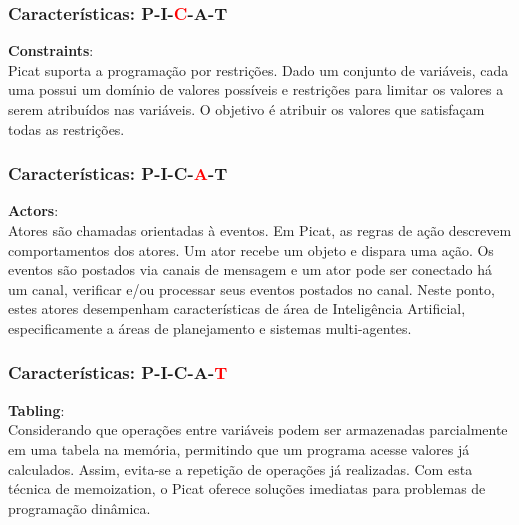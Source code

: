 \documentclass{beamer}
\begin{document}
\begin{frame}
    \frametitle{Características: P-I-\textcolor{red}{C}-A-T}
    \textbf{Constraints}:\\ 
    Picat suporta a programação por restrições. 
    Dado um conjunto de variáveis, 
    cada uma possui um domínio de valores possíveis e restrições para limitar os valores a serem atribuídos nas variáveis. 
    O objetivo é atribuir os valores que satisfaçam todas as restrições. 
\end{frame}


\begin{frame}
    \frametitle{Características: P-I-C-\textcolor{red}{A}-T}
    \textbf{Actors}:\\ 
    Atores são chamadas orientadas à eventos.
		Em Picat, as regras de ação descrevem comportamentos dos atores.
		Um ator recebe um objeto e dispara uma ação. 
		Os eventos são postados via canais de mensagem e um ator pode ser conectado há um canal, verificar e/ou processar seus eventos postados no canal.
		Neste ponto, estes atores desempenham características de área de Inteligência Artificial, especificamente a áreas de planejamento e sistemas multi-agentes.   
\end{frame}


\begin{frame}
    \frametitle{Características: P-I-C-A-\textcolor{red}{T}}
    \textbf{Tabling}:\\ 
    Considerando que operações entre variáveis podem ser armazenadas parcialmente em uma tabela na memória, permitindo que um programa acesse valores já calculados.
		Assim, evita-se a repetição de operações já realizadas.
		Com esta técnica de memoization, o Picat oferece soluções imediatas para problemas de programação dinâmica.
\end{frame}

\end{document}
